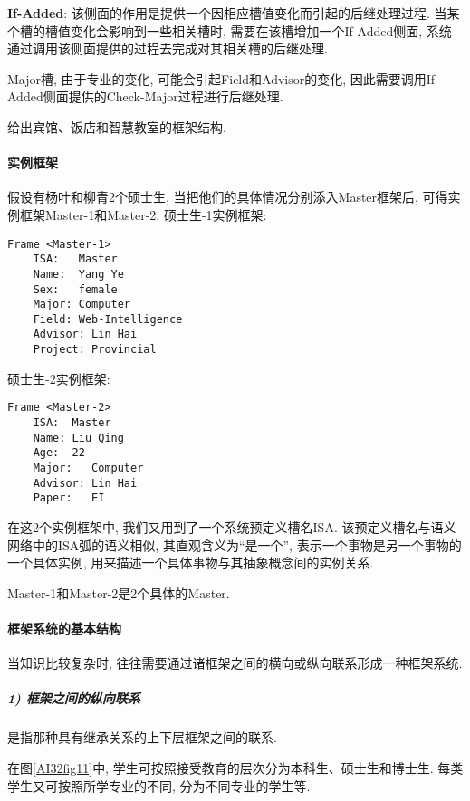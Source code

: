 \textbf{If-Added}: 该侧面的作用是提供一个因相应槽值变化而引起的后继处理过程. 当某个槽的槽值变化会影响到一些相关槽时, 需要在该槽增加一个If-Added侧面, 系统通过调用该侧面提供的过程去完成对其相关槽的后继处理.
\begin{example}
  Major槽, 由于专业的变化, 可能会引起Field和Advisor的变化, 因此需要调用If-Added侧面提供的Check-Major过程进行后继处理.
\end{example}
\begin{example}
    给出宾馆、饭店和智慧教室的框架结构.
\end{example}
\paragraph{实例框架}
\begin{example}
    假设有杨叶和柳青2个硕士生, 当把他们的具体情况分别添入Master框架后, 可得实例框架Master-1和Master-2.
    硕士生-1实例框架:
\begin{Verbatim}
Frame <Master-1>
    ISA:   Master
    Name:  Yang Ye
    Sex:   female
    Major: Computer
    Field: Web-Intelligence
    Advisor: Lin Hai
    Project: Provincial
\end{Verbatim}

硕士生-2实例框架:
\begin{Verbatim}
Frame <Master-2>
    ISA:  Master
    Name: Liu Qing
    Age:  22
    Major:   Computer
    Advisor: Lin Hai
    Paper:   EI
\end{Verbatim}
\end{example}

    在这2个实例框架中, 我们又用到了一个系统预定义槽名ISA. 该预定义槽名与语义网络中的ISA弧的语义相似, 其直观含义为“是一个”, 表示一个事物是另一个事物的一个具体实例, 用来描述一个具体事物与其抽象概念间的实例关系.

\begin{remark}
    Master-1和Master-2是2个具体的Master.
\end{remark}
\paragraph{框架系统的基本结构}
    当知识比较复杂时, 往往需要通过诸框架之间的横向或纵向联系形成一种框架系统.
\subparagraph{1) 框架之间的纵向联系}
是指那种具有继承关系的上下层框架之间的联系.
\begin{example}
    在图\ref{AI32fig11}中, 学生可按照接受教育的层次分为本科生、硕士生和博士生. 每类学生又可按照所学专业的不同, 分为不同专业的学生等.
\end{example}

